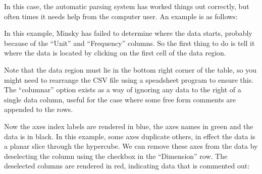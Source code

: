 In this case, the automatic parsing system has worked things out
correctly, but often times it needs help from the computer user. An
example is as follows:

\begin{center}
\end{center}

In this example, Minsky has failed to determine where the data starts,
probably because of the ``Unit'' and ``Frequency'' columns. So the first
thing to do is tell it where the data is located by clicking on the
first cell of the data region. 

\begin{center}
\end{center}

Note that the data region must lie in the bottom right corner of the
table, so you might need to rearrange the CSV file using a speadsheet
program to ensure this. The ``columnar'' option exists as a way of
ignoring any data to the right of a single data column, useful for the
case where some free form comments are appended to the rows.

Now the axes index labels are rendered in blue, the axes names in
green and the data is in black. In this example, some axes duplicate
others, in effect the data is a planar slice through the hypercube. We
can remove these axes from the data by deselecting the column using
the checkbox in the ``Dimension'' row. The deselected columns are
rendered in red, indicating data that is commented out:

